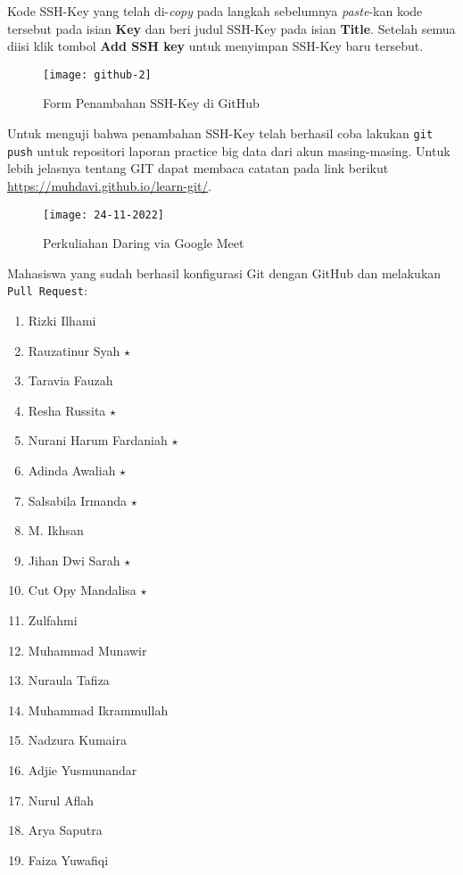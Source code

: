 \documentclass[a4paper]{tufte-handout}
\begin{document}
\begin{enumerate}
Kode SSH-Key yang telah di-\textit{copy} pada langkah sebelumnya \textit{paste}-kan kode tersebut pada isian \textbf{Key} dan beri judul SSH-Key pada isian \textbf{Title}. Setelah semua diisi klik tombol \textbf{Add SSH key} untuk menyimpan SSH-Key baru tersebut.

\begin{figure}[!ht]
\texttt{[image: github-2]}
\caption{Form Penambahan SSH-Key di GitHub}
\label{gam:tambah-ssh}
\end{figure}

Untuk menguji bahwa penambahan SSH-Key telah berhasil coba lakukan {\tt git push} untuk repositori laporan practice big data dari akun masing-masing. Untuk lebih jelasnya tentang GIT dapat membaca catatan pada link berikut \url{https://muhdavi.github.io/learn-git/}.
\end{enumerate}

\begin{figure}[!ht]
\texttt{[image: 24-11-2022]}
\caption{Perkuliahan Daring via Google Meet}
\label{gam:perkuliahan-24-11}
\end{figure}

\vspace*{-.5cm}
\hrulefill

\clearpage
{}


Mahasiswa yang sudah berhasil konfigurasi Git dengan GitHub dan melakukan {\tt Pull Request}:
\begin{multicols}{2}
\begin{enumerate}
\item Rizki Ilhami
\item Rauzatinur Syah $\star$
\item Taravia Fauzah
\item Resha Russita $\star$
\item Nurani Harum Fardaniah $\star$
\item Adinda Awaliah $\star$
\item Salsabila Irmanda $\star$
\item M. Ikhsan
\item Jihan Dwi Sarah $\star$
\item Cut Opy Mandalisa $\star$
\item Zulfahmi
\item Muhammad Munawir
\item Nuraula Tafiza
\item Muhammad Ikrammullah
\item Nadzura Kumaira
\item Adjie Yusmunandar
\item Nurul Aflah
\item Arya Saputra
\item Faiza Yuwafiqi
\end{enumerate}
\end{multicols}
\end{document}
